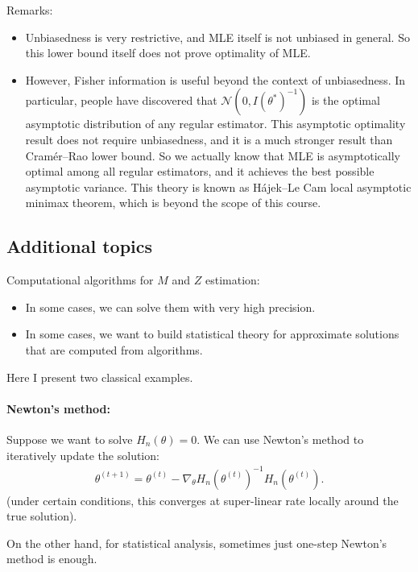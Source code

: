 \documentclass[11pt,letterpaper]{article}
\numberwithin{assumption}{lecture}
\numberwithin{theorem}{lecture}
\numberwithin{proposition}{lecture}
\numberwithin{lemma}{lecture}
\numberwithin{claim}{lecture}
\numberwithin{corollary}{lecture}
\numberwithin{definition}{lecture}
\numberwithin{conjecture}{lecture}
\numberwithin{remark}{lecture}
\numberwithin{example}{lecture}
\numberwithin{equation}{lecture}
\begin{document}
Remarks:
\begin{itemize}
  \item Unbiasedness is very restrictive, and MLE itself is not unbiased in general. So this lower bound itself does not prove optimality of MLE.
  \item However, Fisher information is useful beyond the context of unbiasedness. In particular, people have discovered that $\mathcal{N} (0, I(\theta^*)^{-1})$ is the optimal asymptotic distribution of any regular estimator. This asymptotic optimality result does not require unbiasedness, and it is a much stronger result than Cram\'{e}r--Rao lower bound. So we actually know that MLE is asymptotically optimal among all regular estimators, and it achieves the best possible asymptotic variance. This theory is known as H\'{a}jek--Le Cam local asymptotic minimax theorem, which is beyond the scope of this course.
\end{itemize}

\subsection{Additional topics}
Computational algorithms for $M$ and $Z$ estimation:
\begin{itemize}
  \item In some cases, we can solve them with very high precision.
  \item In some cases, we want to build statistical theory for approximate solutions that are computed from algorithms.
\end{itemize}
Here I present two classical examples.

\paragraph{Newton's method:} Suppose we want to solve $H_n (\theta) = 0$. We can use Newton's method to iteratively update the solution:
\begin{align*}
  \theta^{(t+1)} = \theta^{(t)} - \nabla_\theta H_n (\theta^{(t)})^{-1} H_n (\theta^{(t)}).
\end{align*}
(under certain conditions, this converges at super-linear rate locally around the true solution).

On the other hand, for statistical analysis, sometimes just one-step Newton's method is enough.
\end{document}
